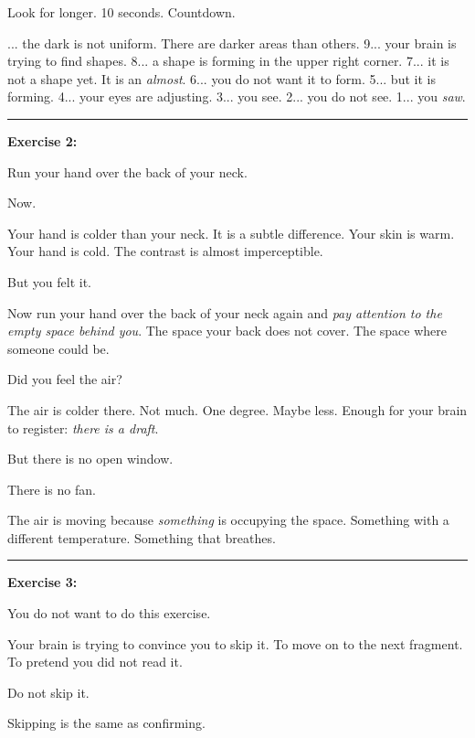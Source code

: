 \noindent Look for longer. 10 seconds. Countdown.

... the dark is not uniform. There are darker areas than others.
9... your brain is trying to find shapes.
8... a shape is forming in the upper right corner.
7... it is not a shape yet. It is an \textit{almost}.
6... you do not want it to form.
5... but it is forming.
4... your eyes are adjusting.
3... you see.
2... you do not see.
1... you \textit{saw}.

\vspace{0.5em}\noindent\rule{\textwidth}{0.5pt}\vspace{0.5em}

\noindent \textbf{Exercise 2:}

\noindent Run your hand over the back of your neck.

\noindent Now.

\noindent Your hand is colder than your neck. It is a subtle difference. Your skin is warm. Your hand is cold. The contrast is almost imperceptible.

\noindent But you felt it.

\noindent Now run your hand over the back of your neck again and \textit{pay attention to the empty space behind you}. The space your back does not cover. The space where someone could be.

\noindent Did you feel the air?

\noindent The air is colder there. Not much. One degree. Maybe less. Enough for your brain to register: \textit{there is a draft}.

\noindent But there is no open window.

\noindent There is no fan.

\noindent The air is moving because \textit{something} is occupying the space. Something with a different temperature. Something that breathes.

\vspace{0.5em}\noindent\rule{\textwidth}{0.5pt}\vspace{0.5em}

\noindent \textbf{Exercise 3:}

\noindent You do not want to do this exercise.

\noindent Your brain is trying to convince you to skip it. To move on to the next fragment. To pretend you did not read it.

\noindent Do not skip it.

\noindent Skipping is the same as confirming.

